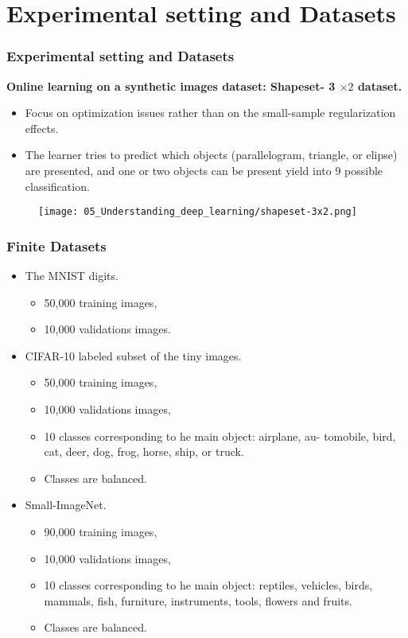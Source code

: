 \section{Experimental setting and Datasets}
\begin{frame}
  \frametitle{Experimental setting and Datasets}
   \textbf{Online learning on a synthetic images dataset: \textbf{Shapeset- 3} $\times 2$ dataset.}
  \begin{itemize}
    \item Focus on optimization issues rather than on the small-sample regularization effects.
    \item  The learner tries to predict which objects (parallelogram, triangle, or elipse) are presented, and one or two objects can be present yield into 9 possible classification.  
  \end{itemize}

  \begin{figure}[t]
    \texttt{[image: 05\_Understanding\_deep\_learning/shapeset-3x2.png]}
    \centering
\end{figure}

\end{frame}

\begin{frame}
  \frametitle{Finite Datasets}

  \begin{itemize}
    \item The MNIST digits. 
    \begin{itemize}
      \item 50,000 training images,
      \item 10,000 validations images.
    \end{itemize}
    \item CIFAR-10 labeled subset of the tiny images. 
    \begin{itemize}
      \item 50,000 training images,
      \item 10,000 validations images,
      \item 10 classes corresponding to he main object:  airplane, au- tomobile, bird, cat, deer, dog, frog, horse, ship, or truck.
      \item Classes are balanced. 
    \end{itemize}

    \item Small-ImageNet. 
   \begin{itemize}
      \item 90,000 training images,
      \item 10,000 validations images,
      \item 10 classes corresponding to he main object: reptiles, vehicles, birds, mammals, fish, furniture, instruments, tools, flowers and fruits.
      \item Classes are balanced. 
    \end{itemize}
  \end{itemize}

\end{frame}


